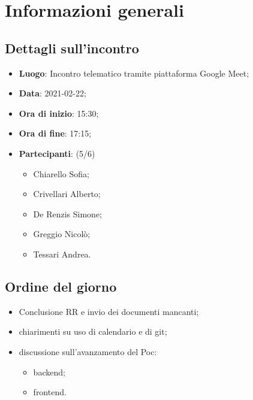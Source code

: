 \section{Informazioni generali}

\subsection{Dettagli sull'incontro}
\begin{itemize}
\item \textbf{Luogo}: Incontro telematico tramite piattaforma Google Meet;
\item \textbf{Data}: 2021-02-22;
\item \textbf{Ora di inizio}: 15:30;
\item \textbf{Ora di fine}: 17:15;
\item \textbf{Partecipanti}: (5/6) 
\begin{itemize}
	\item Chiarello Sofia;
	\item Crivellari Alberto;
	\item De Renzis Simone;
	\item Greggio Nicolò;
	\item Tessari Andrea.

\end{itemize}
\end{itemize}

\subsection{Ordine del giorno}
\begin{itemize}
	\item Conclusione RR e invio dei documenti mancanti;
	\item chiarimenti su uso di calendario e di git;
	\item discussione sull'avanzamento del Poc:
	\begin{itemize}
		\item backend;
		\item frontend.
	\end{itemize}
	
\end{itemize}


